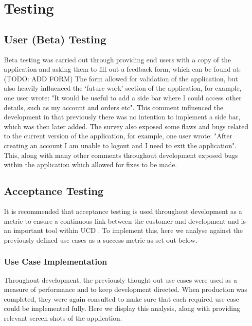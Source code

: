 \documentclass[12pt]{article}
\begin{document}
	
	\section{Testing}
	
	
	\label{use-case-implementation}
	\subsection{User (Beta) Testing}
	Beta testing was carried out through providing end users with a copy of the application and asking them to fill out a feedback form, which can be found at: (TODO: ADD FORM)
	The form allowed for validation of the application, but also heavily influenced the ‘future work’ section of the application, for example, one user wrote:
	"It would be useful to add a side bar where I could access other details, such as my account and orders etc". This comment influenced the development in that previously there was no intention to implement a side bar, which was then later added.
	The survey also exposed some flaws and bugs related to the current version of the application, for example, one user wrote:
	"After creating an account I am unable to logout and I need to exit the application". This, along with many other comments throughout development exposed bugs within the application which allowed for fixes to be made.
	
	\subsection{Acceptance Testing}
	
	It is recommended that acceptance testing is used throughout development as a metric to ensure a continuous link between the customer and development and is an important tool within UCD \cite{humbleContinuousDeliveryReliable2010}. To implement this, here we analyse against the previously defined use cases as a success metric as set out below.
	
	\subsubsection{Use Case Implementation}
	Throughout development, the previously thought out use cases were used as a measure of performance and to keep development directed. When production was completed, they were again consulted to make sure that each required use case could be implemented fully. Here we display this analysis, along with providing relevant screen shots of the application.
	\newline
	
\end{document}
